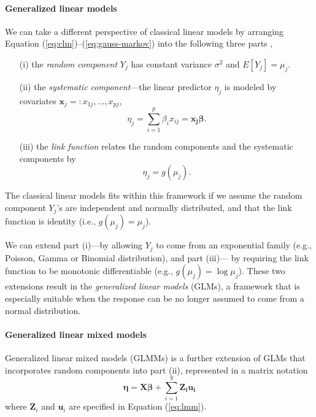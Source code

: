 		
		\paragraph{Generalized linear models}\label{para:glm}
		
				We can take a different perspective of classical linear models by arranging Equation (\ref{eq:clm})--(\ref{eq:gauss-markov}) into the following three parts \citep[Chapter 2]{mccullagh1989generalized}, 
				\begin{enumerate}
					\item[(i)] the \textit{random component} $Y_j$ has constant variance $\sigma^2$ and
					$E[ Y_j]= \mu_j$.
					\item[(ii)] the \textit{systematic component}---the linear predictor $\eta_j$ is modeled by covariates $\bm x_j =: x_{1j},\ldots, x_{pj}$, 
					\begin{equation}\label{eq:part2}
					\eta_j = \sum_{i=1}^p\beta_i x_{ij}=\bm {x_j\beta}.
					\end{equation}
					\item[(iii)] the \textit{link function} relates the random components and the systematic components by 
					\begin{equation}\label{eq:part3}
					\eta_j = g(\mu_j).
					\end{equation}
					\end{enumerate}
		The classical linear models fits within this framework if we assume the random component $Y_j$'s are independent and normally distributed, and that the link function is identity (i.e., $g(\mu_j)= \mu_j$).
		
		 We can extend part (i)---by allowing $Y_j$ to come from an exponential family (e.g., Poisson, Gamma or Binomial distribution), and part (iii)--- by requiring the link function to be monotonic differentiable (e.g., $g(\mu_j)= \log \mu_j$). These two extensions result in the \textit{generalized linear models} (GLMs), a framework that is especially suitable when the response can be no longer assumed to come from a normal distribution.
		
		
		\paragraph{Generalized linear mixed models}\label{para:glmm}
		Generalized linear mixed models (GLMMs) is a further extension of GLMs that incorporates random components into part (ii), represented in a matrix notation
		\begin{equation}\label{eq:q5}
		\bm \eta = \bm {X\beta} + \sum_{i=1}^q\bm {Z_iu_i}
		\end{equation}
		where  $\bm Z_i$ and $\bm u_i$ are specified in Equation (\ref{eq:lmm}). 
		
